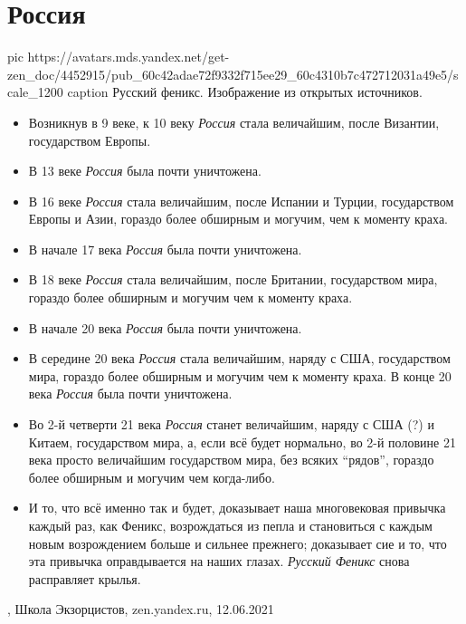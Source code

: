  
 
 
 
 
\chapter{Россия}

\ifcmt
	pic https://avatars.mds.yandex.net/get-zen_doc/4452915/pub_60c42adae72f9332f715ee29_60c4310b7c472712031a49e5/scale_1200
  caption Русский феникс. Изображение из открытых источников.
\fi
\begin{itemize}
\item Возникнув в 9 веке, к 10 веку \emph{Россия} стала величайшим, после Византии, государством Европы.
\item В 13 веке \emph{Россия} была почти уничтожена.
\item В 16 веке \emph{Россия} стала величайшим, после Испании и Турции, государством
Европы и Азии, гораздо более обширным и могучим, чем к моменту краха.
\item В начале 17 века \emph{Россия} была почти уничтожена.
\item В 18 веке \emph{Россия} стала величайшим, после Британии, государством мира, гораздо более обширным и могучим чем к моменту краха.
\item В начале 20 века \emph{Россия} была почти уничтожена.
\item В середине 20 века \emph{Россия} стала величайшим, наряду с США, государством
мира, гораздо более обширным и могучим чем к моменту краха.
В конце 20 века \emph{Россия} была почти уничтожена.
\item Во 2-й четверти 21 века \emph{Россия} станет величайшим, наряду с США (?) и Китаем,
государством мира, а, если всё будет нормально, во 2-й половине 21 века просто
величайшим государством мира, без всяких \enquote{рядов}, гораздо более
обширным и могучим чем когда-либо.
\item И то, что всё именно так и будет, доказывает наша многовековая привычка каждый
раз, как Феникс, возрождаться из пепла и становиться с каждым новым
возрождением больше и сильнее прежнего; доказывает сие и то, что эта привычка
оправдывается на наших глазах. \emph{Русский Феникс} снова расправляет крылья.
\end{itemize}
, 
Школа Экзорцистов, zen.yandex.ru, 12.06.2021


